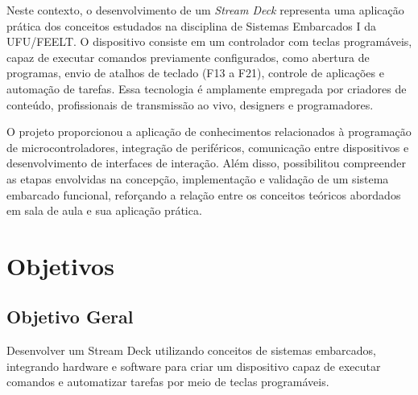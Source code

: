\documentclass[12pt, a4paper]{article}
\begin{document}
Neste contexto, o desenvolvimento de um \textit{Stream Deck} representa uma aplicação prática dos conceitos estudados na disciplina de Sistemas Embarcados I da UFU/FEELT. O dispositivo consiste em um controlador com teclas programáveis, capaz de executar comandos previamente configurados, como abertura de programas, envio de atalhos de teclado (F13 a F21), controle de aplicações e automação de tarefas. Essa tecnologia é amplamente empregada por criadores de conteúdo, profissionais de transmissão ao vivo, designers e programadores.

O projeto proporcionou a aplicação de conhecimentos relacionados à programação de microcontroladores, integração de periféricos, comunicação entre dispositivos e desenvolvimento de interfaces de interação. Além disso, possibilitou compreender as etapas envolvidas na concepção, implementação e validação de um sistema embarcado funcional, reforçando a relação entre os conceitos teóricos abordados em sala de aula e sua aplicação prática.

\section{Objetivos}

\subsection{Objetivo Geral}
\hspace*{1.25cm}Desenvolver um Stream Deck utilizando conceitos de sistemas embarcados, integrando hardware e software para criar um dispositivo capaz de executar comandos e automatizar tarefas por meio de teclas programáveis.
\end{document}
